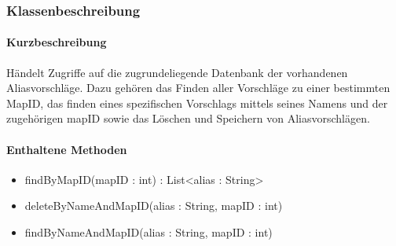 \subsubsection*{Klassenbeschreibung}%
\paragraph*{Kurzbeschreibung}
Händelt Zugriffe auf die zugrundeliegende Datenbank der vorhandenen Aliasvorschläge.
Dazu gehören das Finden aller Vorschläge zu einer bestimmten MapID, das finden eines spezifischen Vorschlags mittels 
seines Namens und der zugehörigen mapID sowie das Löschen und Speichern von Aliasvorschlägen.
\paragraph*{Enthaltene Methoden}
\begin{itemize}
    \item findByMapID(mapID : int) : List<alias : String>
    \item deleteByNameAndMapID(alias : String, mapID : int) 
    \item findByNameAndMapID(alias : String, mapID : int) 
\end{itemize}
